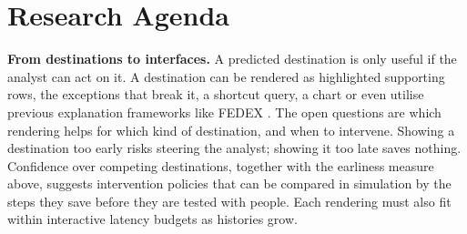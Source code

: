 \documentclass[sigconf]{acmart}
\begin{document}
% 
% 




\section{Research Agenda}
\label{sec:agenda}

\textbf{From destinations to interfaces.}
A predicted destination is only useful if the analyst can act on it. A destination can be rendered as highlighted supporting rows, the exceptions that break it, a shortcut query, a chart or even utilise previous explanation frameworks like FEDEX \cite{deutchFEDEXExplainabilityFramework2022}. The open questions are which rendering helps for which kind of destination, and when to intervene. Showing a destination too early risks steering the analyst; showing it too late saves nothing. Confidence over competing destinations, together with the earliness measure above, suggests intervention policies that can be compared in simulation by the steps they save before they are tested with people. Each rendering must also fit within interactive latency budgets as histories grow.
\end{document}
